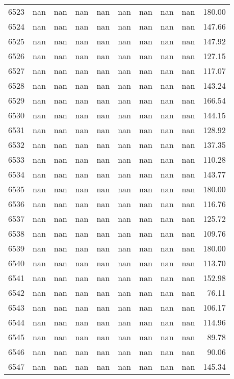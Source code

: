 \begin{tabular}{lrrrrrrrrr}
6523 & nan & nan & nan & nan & nan & nan & nan & nan & 180.00 \\
6524 & nan & nan & nan & nan & nan & nan & nan & nan & 147.66 \\
6525 & nan & nan & nan & nan & nan & nan & nan & nan & 147.92 \\
6526 & nan & nan & nan & nan & nan & nan & nan & nan & 127.15 \\
6527 & nan & nan & nan & nan & nan & nan & nan & nan & 117.07 \\
6528 & nan & nan & nan & nan & nan & nan & nan & nan & 143.24 \\
6529 & nan & nan & nan & nan & nan & nan & nan & nan & 166.54 \\
6530 & nan & nan & nan & nan & nan & nan & nan & nan & 144.15 \\
6531 & nan & nan & nan & nan & nan & nan & nan & nan & 128.92 \\
6532 & nan & nan & nan & nan & nan & nan & nan & nan & 137.35 \\
6533 & nan & nan & nan & nan & nan & nan & nan & nan & 110.28 \\
6534 & nan & nan & nan & nan & nan & nan & nan & nan & 143.77 \\
6535 & nan & nan & nan & nan & nan & nan & nan & nan & 180.00 \\
6536 & nan & nan & nan & nan & nan & nan & nan & nan & 116.76 \\
6537 & nan & nan & nan & nan & nan & nan & nan & nan & 125.72 \\
6538 & nan & nan & nan & nan & nan & nan & nan & nan & 109.76 \\
6539 & nan & nan & nan & nan & nan & nan & nan & nan & 180.00 \\
6540 & nan & nan & nan & nan & nan & nan & nan & nan & 113.70 \\
6541 & nan & nan & nan & nan & nan & nan & nan & nan & 152.98 \\
6542 & nan & nan & nan & nan & nan & nan & nan & nan & 76.11 \\
6543 & nan & nan & nan & nan & nan & nan & nan & nan & 106.17 \\
6544 & nan & nan & nan & nan & nan & nan & nan & nan & 114.96 \\
6545 & nan & nan & nan & nan & nan & nan & nan & nan & 89.78 \\
6546 & nan & nan & nan & nan & nan & nan & nan & nan & 90.06 \\
6547 & nan & nan & nan & nan & nan & nan & nan & nan & 145.34 \\

\end{tabular}
